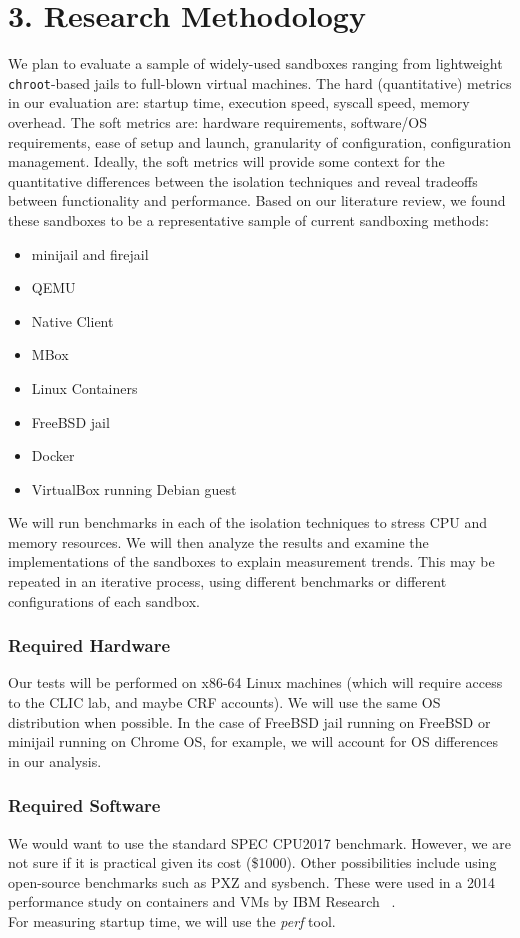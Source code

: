 \documentclass{proc}
\begin{document}
\section*{3. Research Methodology}
We plan to evaluate a sample of widely-used sandboxes ranging from lightweight \texttt{chroot}-based jails to full-blown virtual machines. The hard (quantitative) metrics in our evaluation are: startup time, execution speed, syscall speed, memory overhead. The soft metrics are: hardware requirements, software/OS requirements, ease of setup and launch, granularity of configuration, configuration management. Ideally, the soft metrics will provide some context for the quantitative differences between the isolation techniques and reveal tradeoffs between functionality and performance. 
Based on our literature review, we found these sandboxes to be a representative sample of current sandboxing methods:\vspace{0.5em}
{\small
\begin{itemize}
\item minijail and firejail
\item QEMU
\item Native Client
\item MBox
\item Linux Containers
\item FreeBSD jail
\item Docker
\item VirtualBox running Debian guest
\end{itemize}
}
We will run benchmarks in each of the isolation techniques to stress CPU and memory resources. We will then analyze the results and examine the implementations of the sandboxes to explain measurement trends. This may be repeated in an iterative process, using different benchmarks or different configurations of each sandbox.
\subsubsection*{Required Hardware}
Our tests will be performed on x86-64 Linux machines (which will require access to the CLIC lab, and maybe CRF accounts). We will use the same OS distribution when possible. In the case of FreeBSD jail running on FreeBSD or minijail running on Chrome OS, for example, we will account for OS differences in our analysis. 
\subsubsection*{Required Software}
We would want to use the standard SPEC CPU2017 benchmark. However, we are not sure if it is practical given its cost (\$1000). Other possibilities include using open-source benchmarks such as PXZ and sysbench. These were used in a 2014 performance study on containers and VMs by IBM Research ~\cite{felter2014docker}.\\
For measuring startup time, we will use the \emph{perf} tool.
\end{document}
